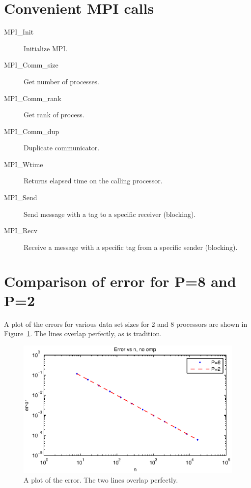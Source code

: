 \clearpage
\section{Convenient MPI calls} %
\label{sec:convenient_mpi_calls}
\begin{description}
  \item[MPI\_Init] Initialize MPI.
  \item[MPI\_Comm\_size] Get number of processes.
  \item[MPI\_Comm\_rank] Get rank of process.
  \item[MPI\_Comm\_dup] Duplicate communicator.
  \item[MPI\_Wtime] Returns elapsed time on the calling processor.
  \item[MPI\_Send] Send message with a tag to a specific receiver (blocking).
  \item[MPI\_Recv] Receive a message with a specific tag from a specific sender (blocking).
\end{description}


\section{Comparison of error for P=8 and P=2} %
\label{sec:comparison_of_error_for_p_8_and_p_2}
A plot of the errors for various data set sizes for 2 and 8 processors are shown in Figure~\ref{fig:error}. The lines overlap perfectly, as is tradition.

\begin{figure}[htbp]
  \centering
  \includegraphics[]{graphics/error.eps}
  \caption{A plot of the error. The two lines overlap perfectly.}
  \label{fig:error}
\end{figure}



